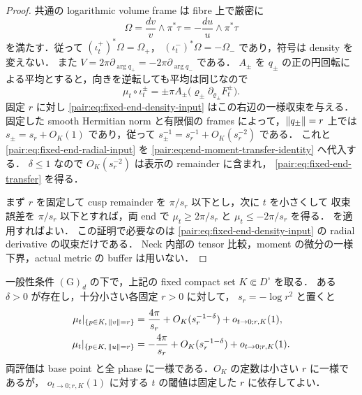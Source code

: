 \begin{proof}
共通の logarithmic volume frame は fibre 上で厳密に
\[
 \Omega=\frac{dv}{v}\wedge\pi^*\tau
       =-\frac{du}{u}\wedge\pi^*\tau
\]
を満たす．従って $(\iota_t^+)^*\Omega=\Omega_+$，
$(\iota_t^-)^*\Omega=-\Omega_-$ であり，符号は density を変えない．
また $V=2\pi\partial_{\arg q_+}=-2\pi\partial_{\arg q_-}$ である．
$A_\pm$ を $q_\pm$ の正の円回転による平均とすると，向きを逆転しても平均は同じなので
\begin{equation}\label{pair:eq:end-moment-transfer-identity}
 \mu_t\circ\iota_t^\pm
 =\pm\pi A_\pm
       \bigl(\varrho_\pm\partial_{\varrho_\pm}F_t^\pm\bigr).
\end{equation}
固定 $r$ に対し \eqref{pair:eq:fixed-end-density-input} はこの右辺の一様収束を与える．
固定した smooth Hermitian norm と有限個の frames によって，$\left\lVert q_\pm\right\rVert=r$ 上では
$s_\pm=s_r+O_K(1)$ であり，従って
$s_\pm^{-1}=s_r^{-1}+O_K(s_r^{-2})$ である．
これと \eqref{pair:eq:fixed-end-radial-input} を
\eqref{pair:eq:end-moment-transfer-identity} へ代入する．
$\delta\le1$ なので $O_K(s_r^{-2})$ は表示の remainder に含まれ，
\eqref{pair:eq:fixed-end-transfer} を得る．

まず $r$ を固定して cusp remainder を $\pi/s_r$ 以下とし，次に $t$ を小さくして
収束誤差を $\pi/s_r$ 以下とすれば，両 end で $\mu_t\ge2\pi/s_r$ と
$\mu_t\le-2\pi/s_r$ を得る． を適用すればよい．
この証明で必要なのは \eqref{pair:eq:fixed-end-density-input} の radial derivative の収束だけである．
Neck 内部の tensor 比較，moment の微分の一様下界，actual metric の buffer は用いない．
\end{proof}

\begin{theorem}
\label{pair:thm:fixed-end-moment}
一般性条件 $\mathrm{(G)}_d$ の下で，上記の fixed compact set $K\Subset D^\circ$ を取る．
ある $\delta>0$ が存在し，十分小さい各固定 $r>0$ に対して，
$s_r=-\log r^2$ と置くと
\begin{align}
 \mu_t|_{\{p\in K,\,\left\lVert v\right\rVert=r\}}
 &=\frac{4\pi}{s_r}+O_K(s_r^{-1-\delta})+o_{t\to0;r,K}(1),
 \label{pair:eq:positive-end-moment}\\
 \mu_t|_{\{p\in K,\,\left\lVert u\right\rVert=r\}}
 &=-\frac{4\pi}{s_r}+O_K(s_r^{-1-\delta})+o_{t\to0;r,K}(1).
 \label{pair:eq:negative-end-moment}
\end{align}
両評価は base point と全 phase に一様である．$O_K$ の定数は小さい $r$ に一様であるが，
$o_{t\to0;r,K}(1)$ に対する $t$ の閾値は固定した $r$ に依存してよい．
\end{theorem}

